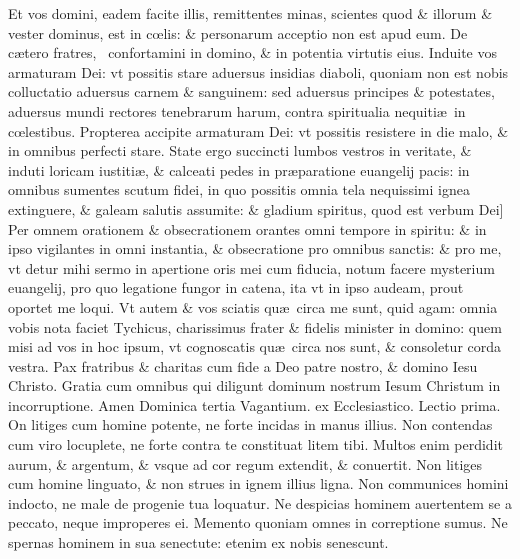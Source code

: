 \documentclass[a5paper,10pt]{book}
\def\leftmarginnote{%
	\lrmarginnote{\hskip -\marginparsep \hskip -6.5em}}
\def\rightmarginnote{%
	\lrmarginnote{\hskip\columnwidth \hskip -1em}}
\def\ae{æ}
\def\oe{œ}
\begin{document}
\begin{multicols*}{2}
Et vos domini, eadem facite illis, remittentes minas, scientes quod \& illorum \& vester dominus, est in c\oe lis: \& personarum acceptio non est apud eum.
De c\ae tero fratres, \textdagger \ 
confortamini\rightmarginnote{B} in domino, \& in potentia virtutis eius.
Induite vos armaturam Dei: vt possitis stare aduersus insidias diaboli, quoniam non est nobis colluctatio aduersus carnem \& sanguinem: sed aduersus principes \& potestates, aduersus mundi rectores tenebrarum harum, contra spiritualia nequiti\ae \ in c\oe lestibus.
Propterea accipite armaturam Dei: vt possitis resistere in die malo, \& in omnibus perfecti stare. State ergo succincti lumbos vestros in veritate, \& induti loricam iustiti\ae , \& calceati pedes in pr\ae paratione euangelij pacis: in omnibus sumentes scutum fidei, in quo possitis omnia tela nequissimi ignea extinguere, \& galeam salutis assumite: \& gladium spiritus, quod est verbum Dei]
Per\rightmarginnote{C} omnem orationem \& obsecrationem orantes omni tempore in spiritu: \& in ipso vigilantes in omni
instantia, \& obsecratione pro omnibus sanctis: \& pro me, vt detur mihi sermo in apertione oris mei cum fiducia, notum facere mysterium euangelij, pro quo legatione fungor in catena, ita vt in ipso audeam, prout oportet me loqui.
Vt autem \& vos sciatis qu\ae \ circa me sunt, quid agam: omnia vobis nota faciet Tychicus, charissimus frater \& fidelis minister in domino: quem misi ad vos in hoc ipsum, vt cognoscatis qu\ae \ circa nos sunt, \& consoletur corda vestra.
Pax fratribus \& charitas cum fide a Deo patre nostro, \& domino Iesu Christo. Gratia cum omnibus qui diligunt dominum nostrum Iesum Christum in incorruptione. Amen
\newline \textswab{C} \color{red} \hypertarget{SUN-TERTIA-VAGAN}{Dominica} tertia Vagantium. ex Ecclesiastico. \quad Lectio prima. \color{black}
\bookmark[rellevel=-1,dest=SUN-TERTIA-VAGAN]{DOMINICA III VAGANTIVM}
\vspace{-.25em}
On\leftmarginnote{\begin{flushright}ca. 8.\end{flushright}} litiges cum homine potente, ne forte incidas in manus illius.
Non contendas cum viro locuplete, ne forte contra te constituat litem tibi. Multos enim perdidit aurum, \& argentum, \& vsque ad cor regum extendit, \& conuertit.
Non litiges cum homine linguato, \& non strues in ignem illius ligna. Non communices homini indocto, ne male de progenie tua loquatur.
Ne despicias hominem auertentem se a peccato, neque improperes ei. Memento quoniam omnes in correptione sumus. Ne spernas hominem in sua senectute: etenim ex nobis senescunt.

\end{multicols*}
\end{document}
